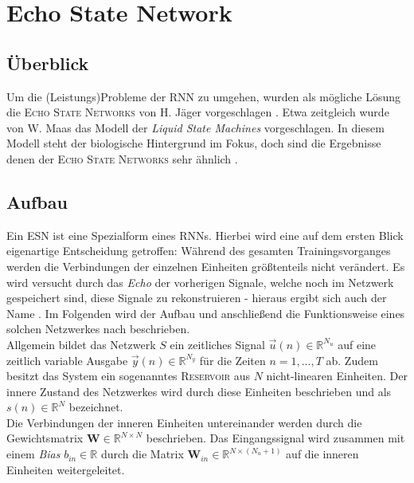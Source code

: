 \section{Echo State Network}
\label{sc:esn}
\subsection{Überblick}
Um die (Leistungs)Probleme der \textsc{RNN} zu umgehen, wurden als mögliche Lösung die \textsc{Echo State Networks} von H. Jäger vorgeschlagen \cite{jaeger2010}. Etwa zeitgleich wurde von W. Maas das Modell der \textit{Liquid State Machines} vorgeschlagen. In diesem Modell steht der biologische Hintergrund im Fokus, doch sind die Ergebnisse denen der \textsc{Echo State Networks} sehr ähnlich \citep{Maass2011}. 

\subsection{Aufbau}
Ein \textsc{ESN} ist eine Spezialform eines \textsc{RNN}s. Hierbei wird eine auf dem ersten Blick eigenartige Entscheidung getroffen: Während des gesamten Trainingsvorganges werden die Verbindungen der einzelnen Einheiten größtenteils nicht verändert. Es wird versucht durch das \textit{Echo} der vorherigen Signale, welche noch im Netzwerk gespeichert sind, diese Signale zu rekonstruieren - hieraus ergibt sich auch der Name \cite{lukoseviciusa2009}. Im Folgenden wird der Aufbau und anschließend die Funktionsweise eines solchen Netzwerkes nach \citep{jaeger2007} beschrieben.\\

Allgemein bildet das Netzwerk $S$ ein zeitliches Signal $\vec{u}(n) \in \mathbb{R}^{N_u}$  auf eine zeitlich variable Ausgabe $\vec{y}(n) \in \mathbb{R}^{N_y}$ für die Zeiten $n=1, ..., T$ ab. Zudem besitzt das System ein sogenanntes \textsc{Reservoir} aus $N$ nicht-linearen Einheiten. Der innere Zustand des Netzwerkes wird durch diese Einheiten beschrieben und als $s(n) \in \mathbb{R}^{N}$ bezeichnet.\\
Die Verbindungen der inneren Einheiten untereinander werden durch die Gewichtsmatrix $\mathbf{W} \in \mathbb{R}^{N \times N}$ beschrieben. Das Eingangssignal wird zusammen mit einem \textit{Bias} $b_{in} \in \mathbb{R}$ durch die Matrix $\mathbf{W}_{in} \in \mathbb{R}^{N \times (N_u+1)}$ auf die inneren Einheiten weitergeleitet.

